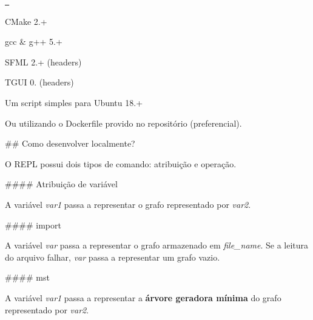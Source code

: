 \href{https://travis-ci.com/pds2-dcc-ufmg/2019-1-grupo19}{\texttt{ }}


\begin{DoxyItemize}
\item C\+Make 2.+
\item gcc \& g++ 5.+
\item S\+F\+ML 2.+ (headers)
\item T\+G\+UI 0. (headers)
\end{DoxyItemize}

Um script simples para Ubuntu 18.+ 
\begin{DoxyCode}{0}
\end{DoxyCode}
 Ou utilizando o Dockerfile provido no repositório (preferencial).

\#\# Como desenvolver localmente? 
\begin{DoxyCode}{0}
\end{DoxyCode}


O R\+E\+PL possui dois tipos de comando\+: atribuição e operação.

\#\#\#\# Atribuição de variável 
\begin{DoxyCode}{0}
\end{DoxyCode}
 A variável {\itshape var1} passa a representar o grafo representado por {\itshape var2}.

\#\#\#\# import 
\begin{DoxyCode}{0}
\end{DoxyCode}
 A variável {\itshape var} passa a representar o grafo armazenado em {\itshape file\+\_\+name}. Se a leitura do arquivo falhar, {\itshape var} passa a representar um grafo vazio.

\#\#\#\# mst 
\begin{DoxyCode}{0}
\end{DoxyCode}
 A variável {\itshape var1} passa a representar a {\bfseries{árvore geradora mínima}} do grafo representado por {\itshape var2}.

